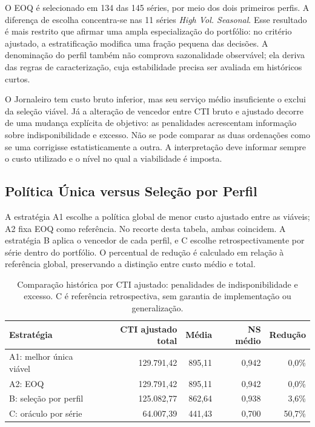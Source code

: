 O EOQ é selecionado em 134 das 145 séries, por meio dos dois primeiros perfis. A diferença de escolha concentra-se nas 11 séries \textit{High Vol. Seasonal}. Esse resultado é mais restrito que afirmar uma ampla especialização do portfólio: no critério ajustado, a estratificação modifica uma fração pequena das decisões. A denominação do perfil também não comprova sazonalidade observável; ela deriva das regras de caracterização, cuja estabilidade precisa ser avaliada em históricos curtos.

O Jornaleiro tem custo bruto inferior, mas seu serviço médio insuficiente o exclui da seleção viável. Já a alteração de vencedor entre CTI bruto e ajustado decorre de uma mudança explícita de objetivo: as penalidades acrescentam informação sobre indisponibilidade e excesso. Não se pode comparar as duas ordenações como se uma corrigisse estatisticamente a outra. A interpretação deve informar sempre o custo utilizado e o nível no qual a viabilidade é imposta.

\subsection{Política Única versus Seleção por Perfil}
\label{sec:custo_politica_unica_vs_perfil}

A estratégia A1 escolhe a política global de menor custo ajustado entre as viáveis; A2 fixa EOQ como referência. No recorte desta tabela, ambas coincidem. A estratégia B aplica o vencedor de cada perfil, e C escolhe retrospectivamente por série dentro do portfólio. O percentual de redução é calculado em relação à referência global, preservando a distinção entre custo médio e total.

\begin{table}[ht]
\centering\small
\caption{Comparação histórica por CTI ajustado: penalidades de indisponibilidade e excesso. C é referência retrospectiva, sem garantia de implementação ou generalização.}
\label{tab:strategy_cost_comparison}
\begin{tabular}{@{}lrrrr@{}}
\toprule
Estratégia & CTI ajustado total & Média & NS médio & Redução\\
\midrule
A1: melhor única viável &129.791,42&895,11&0,942&0,0\%\\
A2: EOQ &129.791,42&895,11&0,942&0,0\%\\
B: seleção por perfil &125.082,77&862,64&0,938&3,6\%\\
C: oráculo por série &64.007,39&441,43&0,700&50,7\%\\
\bottomrule
\end{tabular}
\end{table}

